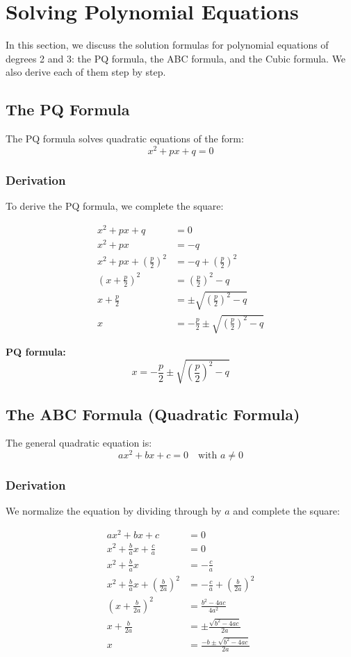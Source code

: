 \section{Solving Polynomial Equations}

In this section, we discuss the solution formulas for polynomial equations of degrees 2 and 3: the PQ formula, the ABC formula, and the Cubic formula. We also derive each of them step by step.

\subsection{The PQ Formula}

The PQ formula solves quadratic equations of the form:
\[
x^2 + px + q = 0
\]

\subsubsection*{Derivation}
To derive the PQ formula, we complete the square:

\begin{align*}
x^2 + px + q &= 0 \\
x^2 + px &= -q \\
x^2 + px + \left(\frac{p}{2}\right)^2 &= -q + \left(\frac{p}{2}\right)^2 \\
\left(x + \frac{p}{2}\right)^2 &= \left(\frac{p}{2}\right)^2 - q \\
x + \frac{p}{2} &= \pm \sqrt{\left(\frac{p}{2}\right)^2 - q} \\
x &= -\frac{p}{2} \pm \sqrt{\left(\frac{p}{2}\right)^2 - q}
\end{align*}

\textbf{PQ formula:}
\[
x = -\frac{p}{2} \pm \sqrt{\left(\frac{p}{2}\right)^2 - q}
\]

\subsection{The ABC Formula (Quadratic Formula)}

The general quadratic equation is:
\[
ax^2 + bx + c = 0
\quad\text{with } a \ne 0
\]

\subsubsection*{Derivation}
We normalize the equation by dividing through by $a$ and complete the square:

\begin{align*}
ax^2 + bx + c &= 0 \\
x^2 + \frac{b}{a}x + \frac{c}{a} &= 0 \\
x^2 + \frac{b}{a}x &= -\frac{c}{a} \\
x^2 + \frac{b}{a}x + \left(\frac{b}{2a}\right)^2 &= -\frac{c}{a} + \left(\frac{b}{2a}\right)^2 \\
\left(x + \frac{b}{2a}\right)^2 &= \frac{b^2 - 4ac}{4a^2} \\
x + \frac{b}{2a} &= \pm \frac{\sqrt{b^2 - 4ac}}{2a} \\
x &= \frac{-b \pm \sqrt{b^2 - 4ac}}{2a}
\end{align*}

